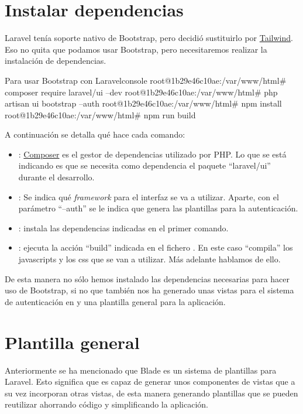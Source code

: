 \chapter{Instalar dependencias}

Laravel tenía soporte nativo de Bootstrap, pero decidió sustituirlo por \href{https://tailwindcss.com/}{Tailwind}. Eso no quita que podamos usar Bootstrap, pero necesitaremos realizar la instalación de dependencias.

\begin{mycode}{Para usar Bootstrap con Laravel}{console}{}
root@1b29e46c10ae:/var/www/html# composer require laravel/ui --dev
root@1b29e46c10ae:/var/www/html# php artisan ui bootstrap --auth
root@1b29e46c10ae:/var/www/html# npm install
root@1b29e46c10ae:/var/www/html# npm run build
\end{mycode}

A continuación se detalla qué hace cada comando:
\begin{itemize}
    \item {}: \href{https://getcomposer.org/}{Composer} es el gestor de dependencias utilizado por PHP. Lo que se está indicando es que se necesita como dependencia el paquete “laravel/ui” durante el desarrollo.
    \item {}: Se indica qué \textit{framework} para el interfaz se va a utilizar. Aparte, con el parámetro “--auth” se le indica que genera las plantillas para la autenticación.
    \item {}: instala las dependencias indicadas en el primer comando.
    \item {}: ejecuta la acción “build” indicada en el fichero . En este caso “compila” los javascripts y los css que se van a utilizar. Más adelante hablamos de ello.
\end{itemize}

De esta manera no sólo hemos instalado las dependencias necesarias para hacer uso de Bootstrap, si no que también nos ha generado unas vistas para el sistema de autenticación en  y una plantilla general para la aplicación.


\chapter{Plantilla general}

Anteriormente se ha mencionado que Blade es un sistema de plantillas para Laravel. Esto significa que es capaz de generar unos componentes de vistas que a su vez incorporan otras vistas, de esta manera generando plantillas que se pueden reutilizar ahorrando código y simplificando la aplicación.

